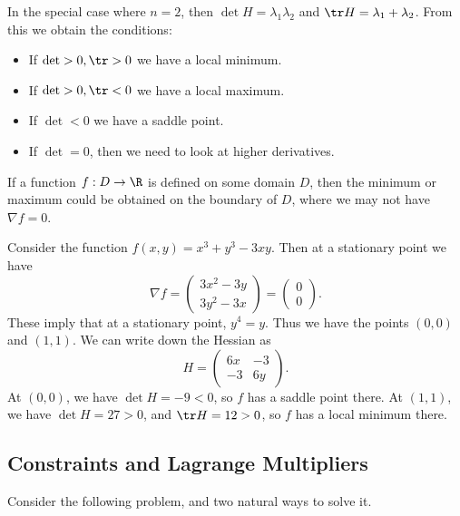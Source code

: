 \documentclass[a4paper]{scrartcl}
\begin{document}
In the special case where $n = 2$, then $\det H = \lambda_1 \lambda_2$ and $\tr H = \lambda_1 + \lambda_2$. From this we obtain the conditions:


\begin{itemize}
	\item If $\det > 0, \tr > 0$ we have a local minimum.
	\item If $\det > 0, \tr < 0$ we have a local maximum.
	\item If $\det < 0$ we have a saddle point.
	\item If $\det = 0$, then we need to look at higher derivatives.
\end{itemize}

\begin{remark}
	If a function $f: D \rightarrow \R$ is defined on some domain $D$, then the minimum or maximum could be obtained on the boundary of $D$, where we may not have $\nabla f = 0$.
\end{remark}

\begin{example}
	Consider the function $f(x, y) = x^3 + y^3 - 3xy$. Then at a stationary point we have
	$$
\nabla f = \begin{pmatrix}
	3x^2 - 3y \\
	3y^2 - 3x
\end{pmatrix} = \begin{pmatrix}
	0 \\ 0
\end{pmatrix}.
	$$
	These imply that at a stationary point, $y^4 = y$. Thus we have the points $(0, 0)$ and $(1, 1)$. We can write down the Hessian as
	$$
	H = \begin{pmatrix}
		6x & -3 \\ -3 & 6y
	\end{pmatrix}.
	$$
	At $(0, 0)$, we have $\det H = -9 < 0$, so $f$ has a saddle point there. At $(1, 1)$, we have $\det H = 27 > 0$, and $\tr H = 12 > 0$, so $f$ has a local minimum there.
\end{example}

\subsection{Constraints and Lagrange Multipliers}

Consider the following problem, and two natural ways to solve it.
\end{document}
